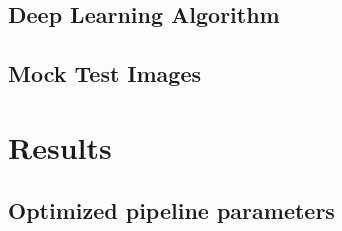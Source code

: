 \documentclass{emulateapj}
\begin{document}


\subsection{Deep Learning Algorithm}

\subsection{Mock Test Images}


\section{Results}
\label{sec:results}
\subsection{Optimized pipeline parameters}
\end{document}
